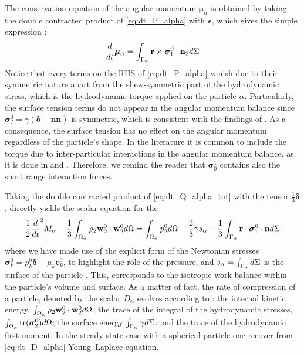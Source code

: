 The conservation equation of the angular momentum $\bm{\mu}_\alpha$ is obtained by taking the double contracted product of \ref{eq:dt_P_alpha} with $\bm\epsilon$, which gives the simple expression :
\begin{equation}
    \frac{d}{d t}\bm{\mu}_\alpha
    =  
    \int_{\Gamma_\alpha}  \textbf{r} \times \bm{\sigma}_1^0\cdot \textbf{n}_2  d\Sigma
    \label{eq:dt_mu_alpha}
\end{equation}
Notice that every terms on the RHS of \ref{eq:dt_P_alpha} vanish due to their symmetric nature apart from the shew-symmetric part of the hydrodynamic stress, which is the hydrodynamic torque applied on the particle $\alpha$.
Particularly, the surface tension terms do not appear in the angular momentum balance since $\bm\sigma_I^0 = \gamma (\bm\delta-\textbf{nn})$ is symmetric, which is consistent with the findings of \citet{hesla1993note}. 
As a consequence, the surface tension has no effect on the angular momentum regardless of the particle's shape. 
In the literature it is common to include the torque due to inter-particular interactions in the angular momentum balance, as it is done in \citet{jackson1997locally} and \citet{zhang1997momentum}.
Therefore, we remind the reader that $\bm{\sigma}_0^1$ contains also the short range interaction forces.

Taking the double contracted product of \ref{eq:dt_Q_alpha_tot} with the tensor $\frac{1}{3}\bm\delta$, directly yields the scalar equation for the 
\begin{equation}
    \frac{1}{2}\frac{d}{d t}^2 {M_\alpha}
    - \frac{1}{3}\int_{\Omega_\alpha}  \rho_2 \textbf{w}_2^0 \cdot \textbf{w}_2^0 d\Omega
    = 
    \int_{\Omega_\alpha} p_2^0 d\Omega 
    - \frac{2}{3} \gamma s_\alpha
    + \frac{1}{3}\int_{\Gamma_\alpha} \textbf{r}\cdot\bm\sigma_1^0\cdot \textbf{n} d\Sigma
    \label{eq:dt_D_alpha}
\end{equation}
where we have made use of the explicit form of the Newtonian stresses $\bm\sigma_k^0 = p_k^0 \bm\delta + \mu_k \textbf{e}_k^0$, to highlight the role of the pressure, and $s_\alpha = \int_{\Gamma_\alpha}  d\Sigma$ is the surface of the particle . 
This, corresponds to the isotropic work balance within the particle's volume and surface. 
As a matter of fact, the rate of compression of a particle, denoted by the scalar $D_\alpha$ evolves according to : 
the internal kinetic energy, $\int_{\Omega_\alpha} \rho_2 \textbf{w}_2^0 \cdot \textbf{w}_2^0  d\Omega$;
the trace of the integral of the hydrodynamic stresses, $\int_{\Omega_\alpha}  \text{tr}(\bm{\sigma}_2^0) d\Omega$; 
the surface energy $\int_{\Gamma_\alpha}  \gamma  d\Sigma$; 
and the trace of the hydrodynamic first moment.
In the steady-state case with a spherical particle one recover from \ref{eq:dt_D_alpha} Young–Laplace equation. 



